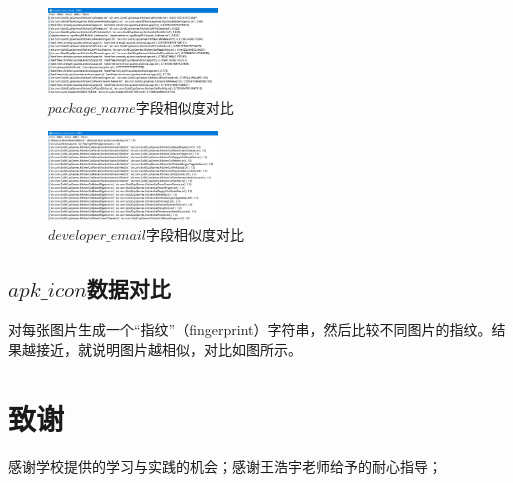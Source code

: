 \documentclass[UTF8,a4paper,10pt, twocolumn]{ctexart}
\begin{document}
\begin{figure}[htbp]
  \centering
  \includegraphics[width=0.4\textwidth]{img/fig6.png}
  \caption{$package\_name$字段相似度对比}
  \label{figure:zju4}
  \end{figure}

\begin{figure}[htbp]
  \centering
  \includegraphics[width=0.4\textwidth]{img/fig7.png}
  \caption{$developer\_email$字段相似度对比}
  \label{figure:zju5}
  \end{figure}

\subsection{$apk\_icon$数据对比}
对每张图片生成一个“指纹”（fingerprint）字符串，然后比较不同图片的指纹。结果越接近，就说明图片越相似，对比如图所示。

\section{致谢}
感谢学校提供的学习与实践的机会；感谢王浩宇老师给予的耐心指导；
\end{document}
